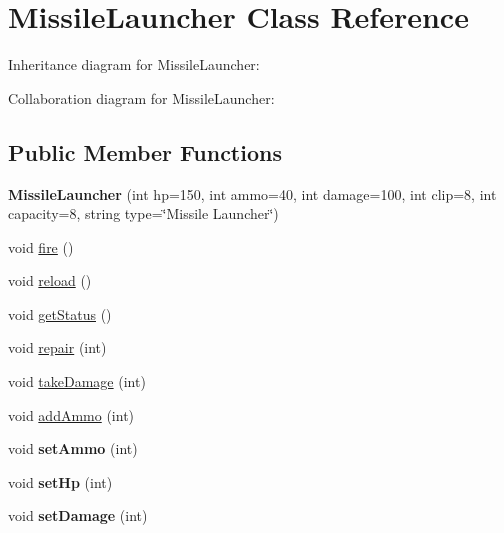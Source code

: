 \hypertarget{classMissileLauncher}{}\section{Missile\+Launcher Class Reference}
\label{classMissileLauncher}


Inheritance diagram for Missile\+Launcher\+:


Collaboration diagram for Missile\+Launcher\+:
\subsection*{Public Member Functions}
\begin{DoxyCompactItemize}
\item 
\mbox{\label{classMissileLauncher_a6f08ee29a2c741369cc17c3f3cdf2926}} 
{\bfseries Missile\+Launcher} (int hp=150, int ammo=40, int damage=100, int clip=8, int capacity=8, string type=\char`\"{}Missile Launcher\char`\"{})
\item 
void \hyperlink{classMissileLauncher_a0f954b8fd239dca4a3bb230c279df1e5}{fire} ()
\item 
void \hyperlink{classMissileLauncher_abf44b5e3a53a77f8df0084264e775f7b}{reload} ()
\item 
void \hyperlink{classMissileLauncher_ab5b475faf878e4f019dedde6cfbd9b88}{get\+Status} ()
\item 
void \hyperlink{classMissileLauncher_ade3b7a73dee2fd60b82e1637036c1c7b}{repair} (int)
\item 
void \hyperlink{classMissileLauncher_adc8ac71046e1a09962799897187e7759}{take\+Damage} (int)
\item 
void \hyperlink{classMissileLauncher_a5952ed03f14045ce84c4c58af6812cfb}{add\+Ammo} (int)
\item 
\mbox{\label{classMissileLauncher_ada89c30fcea6d8c4c2bc1288bb3b4413}} 
void {\bfseries set\+Ammo} (int)
\item 
\mbox{\label{classMissileLauncher_aa75951bc19a91dda297f7a6771097a91}} 
void {\bfseries set\+Hp} (int)
\item 
\mbox{\label{classMissileLauncher_a71661915e0769987ff6576156e7b999f}} 
void {\bfseries set\+Damage} (int)
\item 

\end{DoxyCompactItemize}
